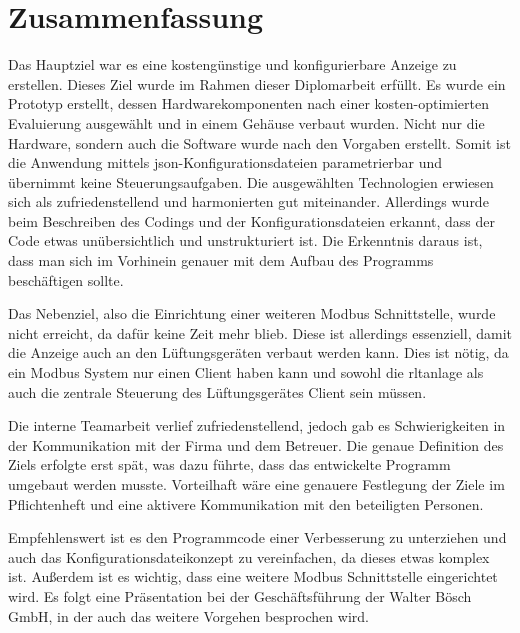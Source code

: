 \ifoot{\leftmark}
\chapter{Zusammenfassung}
Das Hauptziel war es eine kostengünstige und konfigurierbare Anzeige zu erstellen. Dieses Ziel wurde im Rahmen dieser Diplomarbeit erfüllt. Es wurde ein Prototyp erstellt, dessen Hardwarekomponenten nach einer kosten-optimierten Evaluierung ausgewählt und in einem Gehäuse verbaut wurden. Nicht nur die Hardware, sondern auch die Software wurde nach den Vorgaben erstellt. Somit ist die Anwendung mittels \acs{json}-Konfigurationsdateien parametrierbar und übernimmt keine Steuerungsaufgaben. Die ausgewählten Technologien erwiesen sich als zufriedenstellend und harmonierten gut miteinander. Allerdings wurde beim Beschreiben des Codings und der Konfigurationsdateien erkannt, dass der Code etwas unübersichtlich und unstrukturiert ist. Die Erkenntnis daraus ist, dass man sich im Vorhinein genauer mit dem Aufbau des Programms beschäftigen sollte.

Das Nebenziel, also die Einrichtung einer weiteren Modbus Schnittstelle, wurde nicht erreicht, da dafür keine Zeit mehr blieb. Diese ist allerdings essenziell, damit die Anzeige auch an den Lüftungsgeräten verbaut werden kann. Dies ist nötig, da ein Modbus System nur einen Client haben kann und sowohl die \acs{rltanlage} als auch die zentrale Steuerung des Lüftungsgerätes Client sein müssen.

Die interne Teamarbeit verlief zufriedenstellend, jedoch gab es Schwierigkeiten in der Kommunikation mit der Firma und dem Betreuer. Die genaue Definition des Ziels erfolgte erst spät, was dazu führte, dass das entwickelte Programm umgebaut werden musste. Vorteilhaft wäre eine genauere Festlegung der Ziele im Pflichtenheft und eine aktivere Kommunikation mit den beteiligten Personen.

Empfehlenswert ist es den Programmcode einer Verbesserung zu unterziehen und auch das Konfigurationsdateikonzept zu vereinfachen, da dieses etwas komplex ist. Außerdem ist es wichtig, dass eine weitere Modbus Schnittstelle eingerichtet wird.
Es folgt eine Präsentation bei der Geschäftsführung der Walter Bösch GmbH, in der auch das weitere Vorgehen besprochen wird.